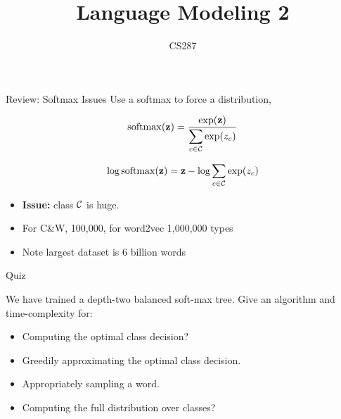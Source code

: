 \documentclass{beamer}
\title{Language Modeling 2}
\date{}
\author{CS287}
\begin{document}
\begin{frame}
  \titlepage
\end{frame}


\begin{frame}{Review: Softmax Issues}
  Use a softmax to force a distribution,

  \[\softmax(\boldz) = \frac{\exp(\boldz)}{\displaystyle \sum_{c\in \mcC } \exp(z_c)}  \]

  \[\log \softmax(\boldz) = \boldz - \log \sum_{c\in \mcC} \exp(z_c)  \]

  \begin{itemize}
  \item \textbf{Issue:} class $\mathcal{C}$ is huge.
  \item For C\&W, 100,000, for word2vec 1,000,000 types
  \item Note largest dataset is 6 billion words
  \end{itemize}

\end{frame}

\begin{frame}{Quiz}

  We have trained a depth-two balanced soft-max tree.
  Give an algorithm and time-complexity for:

  \begin{itemize}
  \item Computing the optimal class decision?
  \item Greedily approximating the optimal class decision.
  \item Appropriately sampling a word.
  \item Computing the full distribution over classes?
  \end{itemize}
\end{frame}
\end{document}
